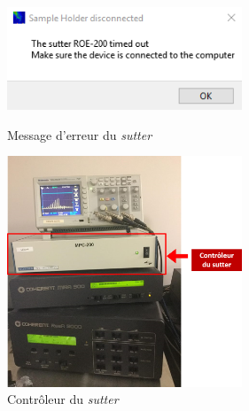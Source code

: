 \begin{figure}[H]
%
\begin{minipage}{0.45\textwidth}
\centering
\includegraphics[width=7cm]{sauce.PNG}
\caption{Message d'erreur du \textit{sutter}}
\label{fig:sauce}
\end{minipage}
%
\hfill
%
\begin{minipage}{0.45\linewidth}
\includegraphics[width=7cm]{sutter.png}
\caption{Contrôleur du \textit{sutter}}
\label{fig:sutter}
\end{minipage}
%
\end{figure}